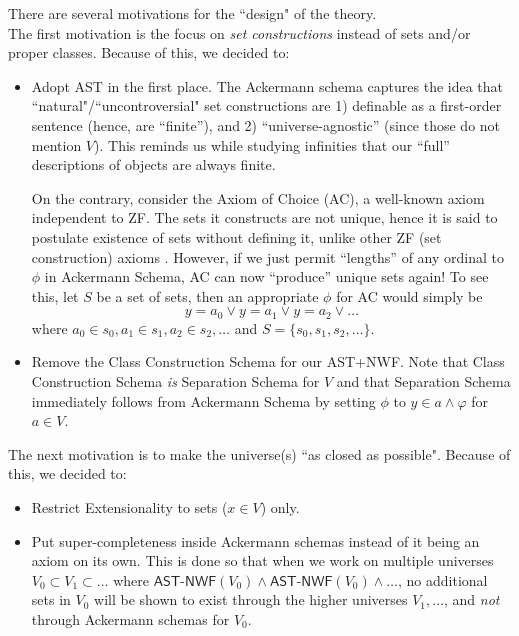 \documentclass{article}
\begin{document}
There are several motivations for the ``design" of the theory.\\

The first motivation is the focus on \textit{set constructions} instead of sets and/or proper classes. Because of this, we decided to:
\begin{itemize}
\item Adopt AST in the first place. The Ackermann schema captures the idea that ``natural"/``uncontroversial" set constructions are 1) definable as a first-order sentence (hence, are ``finite''), and 2) ``universe-agnostic'' (since those do not mention $V$). This reminds us while studying infinities that our ``full'' descriptions of objects are always finite.

On the contrary, consider the Axiom of Choice (AC), a well-known axiom independent to ZF. The sets it constructs are not unique, hence it is said to postulate existence of sets without defining it, unlike other ZF (set construction) axioms \cite[Chapter 5]{jech}. However, if we just permit ``lengths'' of any ordinal to $\phi$ in Ackermann Schema, AC can now ``produce'' unique sets again! To see this, let $S$ be a set of sets, then an appropriate $\phi$ for AC would simply be $$y = a_0 \vee y = a_1 \vee y = a_2 \vee \ldots$$ where $a_0 \in s_0, a_1 \in s_1, a_2 \in s_2, \ldots$ and $S=\{s_0, s_1, s_2, \ldots\}$. 
\item Remove the Class Construction Schema for our \textsf{AST+NWF}. Note that Class Construction Schema \textit{is} Separation Schema for $V$ and that Separation Schema immediately follows from Ackermann Schema by setting $\phi$ to $y \in a \wedge \varphi$ for $a\in V$.
\end{itemize}

The next motivation is to make the universe(s) ``as closed as possible". Because of this, we decided to:
\begin{itemize}
\item Restrict Extensionality to sets ($x \in V$) only.
\item Put super-completeness inside Ackermann schemas instead of it being an axiom on its own. This is done so that when we work on multiple universes $V_0 \subset V_1 \subset \ldots$ where $ \textsf{AST-NWF}(V_0) \wedge \textsf{AST-NWF}(V_0) \wedge\ldots$, no additional sets in $V_0$ will be shown to exist through the higher universes $V_1, \ldots$, and \textit{not} through Ackermann schemas for $V_0$.
\end{itemize}
\end{document}

